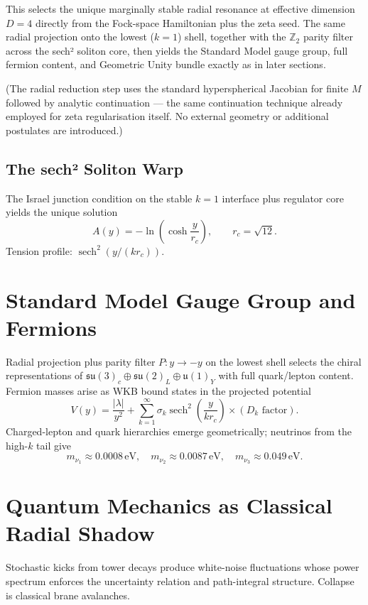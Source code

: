 \documentclass[11pt,a4paper,oneside]{article}
\newcommand{\sech}{\operatorname{sech}}
\begin{document}
This selects the unique marginally stable radial resonance at effective dimension \(D=4\) directly from the Fock-space Hamiltonian plus the zeta seed. The same radial projection onto the lowest (\(k=1\)) shell, together with the \(\mathbb{Z}_2\) parity filter across the sech² soliton core, then yields the Standard Model gauge group, full fermion content, and Geometric Unity bundle exactly as in later sections.

(The radial reduction step uses the standard hyperspherical Jacobian for finite \(M\) followed by analytic continuation — the same continuation technique already employed for zeta regularisation itself. No external geometry or additional postulates are introduced.)

\subsection{The sech² Soliton Warp}

The Israel junction condition on the stable \(k=1\) interface plus regulator core yields the unique solution
\[
A(y) = -\ln\left(\cosh\frac{y}{r_c}\right), \qquad r_c = \sqrt{12}.
\]
Tension profile: \(\sech^2(y/(k r_c))\).

\section{Standard Model Gauge Group and Fermions}

Radial projection plus parity filter \(P: y\to -y\) on the lowest shell selects the chiral representations of \(\mathfrak{su}(3)_c \oplus \mathfrak{su}(2)_L \oplus \mathfrak{u}(1)_Y\) with full quark/lepton content. Fermion masses arise as WKB bound states in the projected potential
\[
V(y) = \frac{|\lambda|}{y^2} + \sum_{k=1}^\infty \sigma_k \sech^2\left(\frac{y}{k r_c}\right) \times (D_k\text{ factor}).
\]
Charged-lepton and quark hierarchies emerge geometrically; neutrinos from the high-\(k\) tail give
\[
m_{\nu_1} \approx 0.0008\,\text{eV},\quad m_{\nu_2} \approx 0.0087\,\text{eV},\quad m_{\nu_3} \approx 0.049\,\text{eV}.
\]

\section{Quantum Mechanics as Classical Radial Shadow}

Stochastic kicks from tower decays produce white-noise fluctuations whose power spectrum enforces the uncertainty relation and path-integral structure. Collapse is classical brane avalanches.
\end{document}
